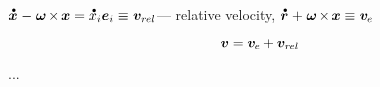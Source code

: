 \begin{otherlanguage}{russian}
${
\mathdotabove{\bm{x}} \hspace{.1ex} - \hspace{.1ex} \bm{\omega} \hspace{-0.2ex} \times \hspace{-0.2ex} \bm{x} = \mathdotabove{x}_i \bm{e}_i
\equiv \hspace{.1ex} \bm{v}_{r\kern-0.1exel}
}$\:--- relative velocity,
${
\mathdotabove{\locationvector} \hspace{.1ex} + \hspace{.1ex} \bm{\omega} \hspace{-0.2ex} \times \hspace{-0.2ex} \bm{x}
\equiv \hspace{.1ex} \bm{v}_{\hspace{-0.1ex}e}
}$

\begin{equation}
\bm{v} = \bm{v}_{\hspace{-0.1ex}e} \hspace{-0.1ex} + \bm{v}_{r\kern-0.1exel}
\end{equation}

...


\end{otherlanguage}
